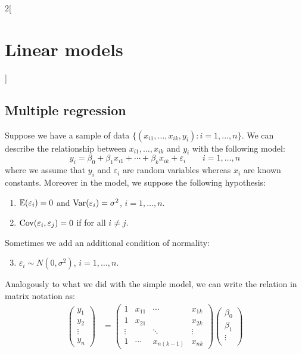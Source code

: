 \documentclass[../../../main_math.tex]{subfiles}
\begin{document}
\begin{multicols}{2}[\section{Linear models}]
  \subsection{Multiple regression}
  \begin{definition}
    Suppose we have a sample of data $\{(x_{i1},\ldots,x_{ik},y_i):i=1,\ldots,n\}$. We can describe the relationship between $x_{i1},\ldots,x_{ik}$ and $y_i$ with the following model:
    $$y_i=\beta_0+\beta_1x_{i1}+\cdots+\beta_kx_{ik}+\varepsilon_i\qquad i=1,\ldots,n$$
    where we assume that $y_i$ and $\varepsilon_i$ are random variables whereas $x_i$ are known constants. Moreover in the model, we suppose the following hypothesis:
    \begin{enumerate}
      \item $\mathbb{E}(\varepsilon_i)=0$ and $\mathrm{Var}(\varepsilon_i)=\sigma^2$, $i=1,\ldots,n$.
      \item $\mathrm{Cov}(\varepsilon_i,\varepsilon_j)=0$ if for all $i\ne j$.
    \end{enumerate}
    Sometimes we add an additional condition of normality:
    \begin{enumerate}\setcounter{enumii}{2}
      \item $\varepsilon_i\sim N(0,\sigma^2)$, $i=1,\ldots,n$.
    \end{enumerate}
    Analogously to what we did with the simple model, we can write the relation in matrix notation as:
    \begin{align}
      \nonumber\begin{pmatrix}
                 y_1    \\
                 y_2    \\
                 \vdots \\
                 y_n
               \end{pmatrix} & =
      \begin{pmatrix}
        1      & x_{11} & \cdots     & x_{1k} \\
        1      & x_{21} &            & x_{2k} \\
        \vdots &        & \ddots     & \vdots \\
        1      & \cdots & x_{n(k-1)} & x_{nk}
      \end{pmatrix}\begin{pmatrix}
                     \beta_0 \\
                     \beta_1 \\
                     \vdots  \\

\end{pmatrix}
\end{align}
\end{definition}
\end{multicols}
\end{document}
